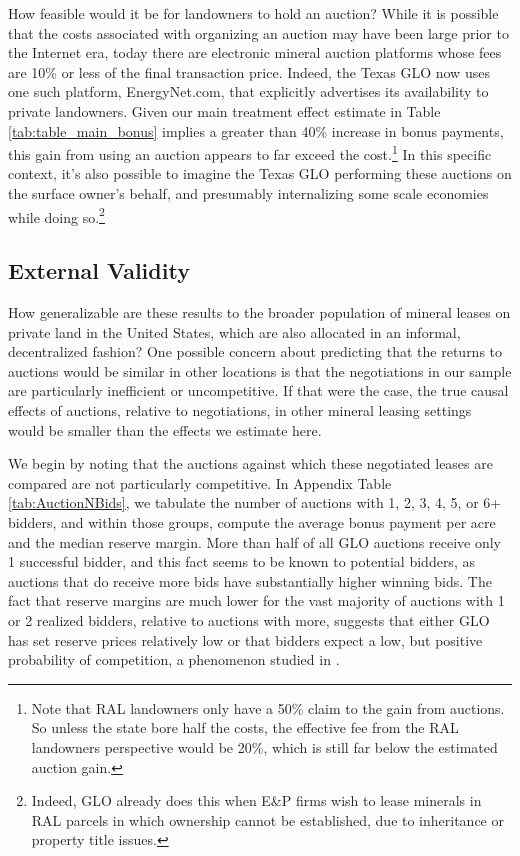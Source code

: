 \documentclass[12pt]{article}
\begin{document}
How feasible would it be for landowners to hold an auction? While it is possible that the costs associated with organizing an auction may have been large prior to the Internet era, today there are electronic mineral auction platforms whose fees are 10\% or less of the final transaction price.  Indeed, the Texas GLO now uses one such platform, EnergyNet.com, that explicitly advertises its availability to private landowners.  Given our main treatment effect estimate in Table \ref{tab:table_main_bonus} implies a greater than 40\% increase in bonus payments, this gain from using an auction appears to far exceed the cost.\footnote{Note that RAL landowners only have a 50\% claim to the gain from auctions. So unless the state bore half the costs, the effective fee from the RAL landowners perspective would be 20\%, which is still far below the estimated auction gain.} In this specific context, it's also possible to imagine the Texas GLO performing these auctions on the surface owner's behalf, and presumably internalizing some scale economies while doing so.\footnote{Indeed, GLO already does this when E\&P firms wish to lease minerals in RAL parcels in which ownership cannot be established, due to inheritance or property title issues.} 
\subsection{External Validity}
How generalizable are these results to the broader population of mineral leases on private land in the United States, which are also allocated in an informal, decentralized fashion? One possible concern about predicting that the returns to auctions would be similar in other locations is that the negotiations in our sample are particularly inefficient or uncompetitive. If that were the case, the true causal effects of auctions, relative to negotiations, in other mineral leasing settings would be smaller than the effects we estimate here.

We begin by noting that the auctions against which these negotiated leases are compared are not particularly competitive. In Appendix Table \ref{tab:AuctionNBids}, we tabulate the number of auctions with 1, 2, 3, 4, 5, or 6+ bidders, and within those groups, compute the average bonus payment per acre and the median reserve margin.  More than half of all GLO auctions receive only 1 successful bidder, and this fact seems to be known to potential bidders, as auctions that do receive more bids have substantially higher winning bids.  The fact that reserve margins are much lower for the vast majority of auctions with 1 or 2 realized bidders, relative to auctions with more, suggests that either GLO has set reserve prices relatively low or that bidders expect a low, but positive probability of competition, a phenomenon studied in \cite{kong_selective_2017}. 
 
\end{document}

